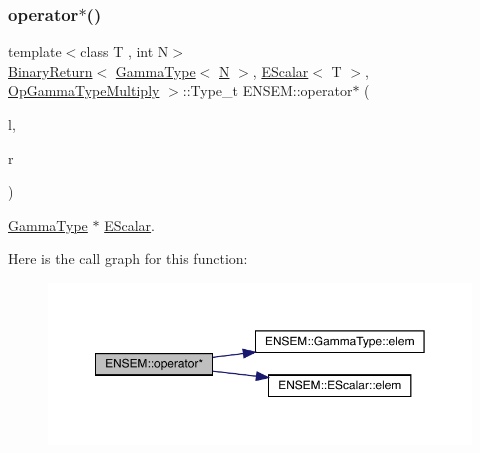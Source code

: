 \subsubsection{\texorpdfstring{operator$\ast$()}{operator*()}\hspace{0.1cm}{\footnotesize\ttfamily [4/9]}}
{\footnotesize\ttfamily template$<$class T , int N$>$ \\
\mbox{\hyperlink{structENSEM_1_1BinaryReturn}{Binary\+Return}}$<$ \mbox{\hyperlink{classENSEM_1_1GammaType}{Gamma\+Type}}$<$ \mbox{\hyperlink{operator__name__util_8cc_a7722c8ecbb62d99aee7ce68b1752f337}{N}} $>$, \mbox{\hyperlink{classENSEM_1_1EScalar}{E\+Scalar}}$<$ T $>$, \mbox{\hyperlink{structENSEM_1_1OpGammaTypeMultiply}{Op\+Gamma\+Type\+Multiply}} $>$\+::Type\+\_\+t E\+N\+S\+E\+M\+::operator$\ast$ (\begin{DoxyParamCaption}\item[{const \mbox{\hyperlink{classENSEM_1_1GammaType}{Gamma\+Type}}$<$ \mbox{\hyperlink{operator__name__util_8cc_a7722c8ecbb62d99aee7ce68b1752f337}{N}} $>$ \&}]{l,  }\item[{const \mbox{\hyperlink{classENSEM_1_1EScalar}{E\+Scalar}}$<$ T $>$ \&}]{r }\end{DoxyParamCaption})\hspace{0.3cm}{\ttfamily [inline]}}



\mbox{\hyperlink{classENSEM_1_1GammaType}{Gamma\+Type}} $\ast$ \mbox{\hyperlink{classENSEM_1_1EScalar}{E\+Scalar}}. 

Here is the call graph for this function\+:
\nopagebreak
\begin{figure}[H]
\begin{center}
\leavevmode
\includegraphics[width=350pt]{d4/dca/group__escalar_ga53bf11728d0f1f7fb9dea51cd221792d_cgraph}
\end{center}
\end{figure}
\mbox{\label{group__escalar_gacd3a5ba72921d671ee94910188b8c179}} 
